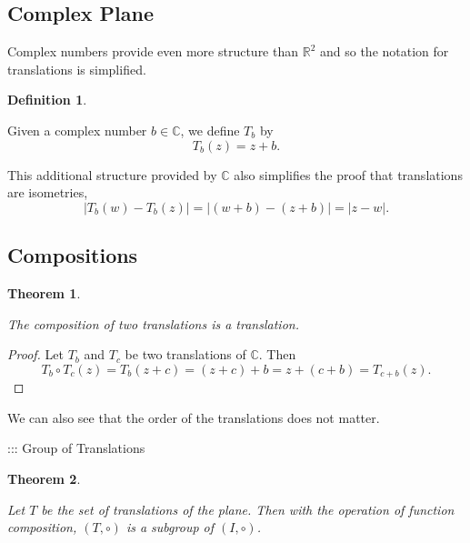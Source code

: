\documentclass[
]{book}
\newtheorem{theorem}{Theorem}[chapter]
\theoremstyle{definition}
\newtheorem{definition}{Definition}[chapter]
\theoremstyle{definition}
\theoremstyle{definition}
\theoremstyle{definition}
\theoremstyle{remark}
\begin{document}
\hypertarget{complex-plane-1}{%
\subsection{Complex Plane}\label{complex-plane-1}}

Complex numbers provide even more structure than \(\mathbb{R}^2\) and so the notation for translations is simplified.

\begin{definition}
\protect\hypertarget{def:unlabeled-div-260}{}\label{def:unlabeled-div-260}

Given a complex number \(b\in \mathbb{C}\), we define \(T_b\) by \[T_b(z) = z+b.\]

\end{definition}

This additional structure provided by \(\mathbb{C}\) also simplifies the proof that translations are isometries,
\[ \left| T_b(w)-T_b(z)\right| = \left|(w+b)-(z+b)\right| = |z-w|.\]

\hypertarget{compositions}{%
\subsection{Compositions}\label{compositions}}

\begin{theorem}
\protect\hypertarget{thm:unlabeled-div-261}{}\label{thm:unlabeled-div-261}

The composition of two translations is a translation.

\end{theorem}

\begin{proof}

Let \(T_b\) and \(T_c\) be two translations of \(\mathbb{C}\). Then
\[T_b\circ T_c(z) = T_b(z+c) = (z+c)+b = z + (c+b) = T_{c+b}(z).\]

\end{proof}

We can also see that the order of the translations does not matter.

::: Group of Translations

\begin{theorem}
\protect\hypertarget{thm:unlabeled-div-263}{}\label{thm:unlabeled-div-263}

Let \(T\) be the set of translations of the plane. Then with the operation of function composition, \((T,\circ)\) is a subgroup of \((I,\circ )\).

\end{theorem}
\end{document}
